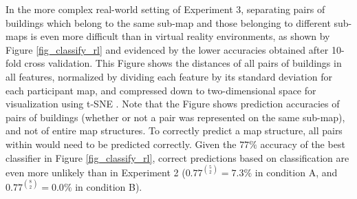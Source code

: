 In the more complex real-world setting of Experiment 3, separating pairs of buildings which belong to the same sub-map and those belonging to different sub-maps is even more difficult than in virtual reality environments, as shown by Figure \ref{fig_classify_rl} and evidenced by the lower accuracies obtained after 10-fold cross validation. This Figure shows the distances of all pairs of buildings in all features, normalized by dividing each feature by its standard deviation for each participant map, and compressed down to two-dimensional space for visualization using t-SNE \citep{van2008visualizing}. Note that the Figure shows prediction accuracies of pairs of buildings (whether or not a pair was represented on the same sub-map), and not of entire map structures. To correctly predict a map structure, all pairs within would need to be predicted correctly. Given the $77 \%$ accuracy of the best classifier in Figure \ref{fig_classify_rl}, correct predictions based on classification are even more unlikely than in Experiment 2 ($0.77^{5 \choose 2}=7.3 \%$ in condition A, and $0.77^{8 \choose 2}=0.0 \%$ in condition B).





